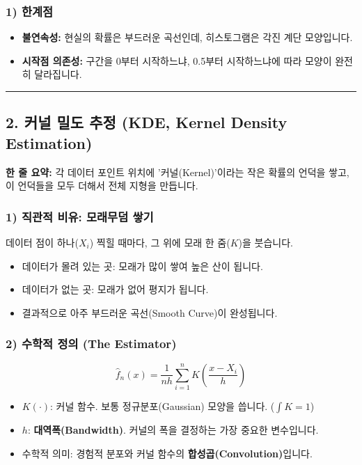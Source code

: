 \documentclass[11pt,a4paper]{book}
\theoremstyle{definition}
\begin{document}
\subsubsection*{1) 한계점}
\begin{itemize}
    \item \textbf{불연속성:} 현실의 확률은 부드러운 곡선인데, 히스토그램은 각진 계단 모양입니다.
    \item \textbf{시작점 의존성:} 구간을 0부터 시작하느냐, 0.5부터 시작하느냐에 따라 모양이 완전히 달라집니다.
\end{itemize}

\vspace{0.5cm}\hrule\vspace{0.5cm}

\subsection{2. 커널 밀도 추정 (KDE, Kernel Density Estimation)}

\begin{conceptbox}[title={개념 2: 벽돌 대신 모래를 쌓자}]
\textbf{한 줄 요약:} 각 데이터 포인트 위치에 '커널(Kernel)'이라는 작은 확률의 언덕을 쌓고, 이 언덕들을 모두 더해서 전체 지형을 만듭니다.
\end{conceptbox}

\subsubsection*{1) 직관적 비유: 모래무덤 쌓기}
데이터 점이 하나($X_i$) 찍힐 때마다, 그 위에 모래 한 줌($K$)을 붓습니다.
\begin{itemize}
    \item 데이터가 몰려 있는 곳: 모래가 많이 쌓여 높은 산이 됩니다.
    \item 데이터가 없는 곳: 모래가 없어 평지가 됩니다.
    \item 결과적으로 아주 부드러운 곡선(Smooth Curve)이 완성됩니다.
\end{itemize}

\subsubsection*{2) 수학적 정의 (The Estimator)}
$$ \hat{f}_n(x) = \frac{1}{nh} \sum_{i=1}^n K\left( \frac{x - X_i}{h} \right) $$
\begin{itemize}
    \item $K(\cdot)$: 커널 함수. 보통 정규분포(Gaussian) 모양을 씁니다. ($\int K = 1$)
    \item $h$: \textbf{대역폭(Bandwidth)}. 커널의 폭을 결정하는 가장 중요한 변수입니다.
    \item 수학적 의미: 경험적 분포와 커널 함수의 \textbf{합성곱(Convolution)}입니다.
\end{itemize}
\end{document}
